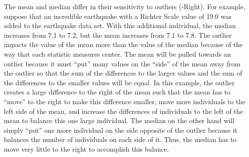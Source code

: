\begin{knitrout}
\color{fgcolor}\begin{kframe}


{\ttfamily\noindent\bfseries{}}

{\ttfamily\noindent\bfseries\color{errorcolor}{\#\# Error in eval(expr, envir, enclos): object 'mnmdn' not found}}

{\ttfamily\noindent\bfseries{}}

{\ttfamily\noindent\bfseries\color{errorcolor}{\#\# Error in eval(expr, envir, enclos): object 'mnmdn1' not found}}\end{kframe}
\end{knitrout}


\vspace{-12pt}

The mean and median differ in their sensitivity to outliers (-Right). For example, suppose that an incredible earthquake with a Richter Scale value of 19.0 was added to the earthquake data set. With this additional individual, the median increases from 7.1 to 7.2, but the mean increases from 7.1 to 7.8. The outlier impacts the value of the mean more than the value of the median because of the way that each statistic measures center. The mean will be pulled towards an outlier because it must ``put'' many values on the ``side'' of the mean away from the outlier so that the sum of the differences to the larger values and the sum of the differences to the smaller values will be equal. In this example, the outlier creates a large difference to the right of the mean such that the mean has to ``move'' to the right to make this difference smaller, move more individuals to the left side of the mean, and increase the differences of individuals to the left of the mean to balance this one large individual. The median on the other hand will simply ``put'' one more individual on the side opposite of the outlier because it balances the number of individuals on each side of it. Thus, the median has to move very little to the right to accomplish this balance.

